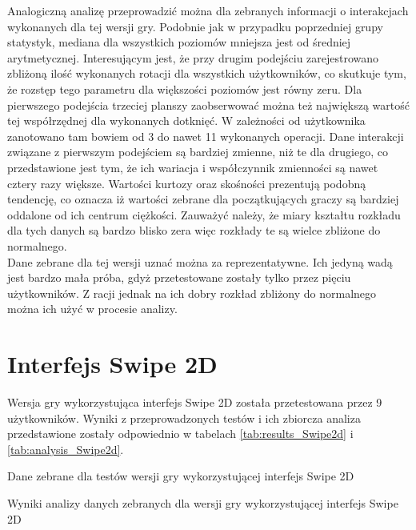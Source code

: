 \documentclass[a4paper,12pt,numbers=noenddot]{report}
\begin{document}
Analogiczną analizę przeprowadzić można dla zebranych informacji o interakcjach wykonanych dla tej wersji gry. Podobnie jak w przypadku poprzedniej grupy statystyk, mediana dla wszystkich poziomów mniejsza jest od średniej arytmetycznej. Interesującym jest, że przy drugim podejściu zarejestrowano zbliżoną ilość wykonanych rotacji dla wszystkich użytkowników, co skutkuje tym, że rozstęp tego parametru dla większości poziomów jest równy zeru. Dla pierwszego podejścia trzeciej planszy zaobserwować można też największą wartość tej współrzędnej dla wykonanych dotknięć. W zależności od użytkownika zanotowano tam bowiem od 3 do nawet 11 wykonanych operacji.
Dane interakcji związane z pierwszym podejściem są bardziej zmienne, niż te dla drugiego, co przedstawione jest tym, że ich wariacja i współczynnik zmienności są nawet cztery razy większe. Wartości kurtozy oraz skośności prezentują podobną tendencję, co oznacza iż wartości zebrane dla początkujących graczy są bardziej oddalone od ich centrum ciężkości. Zauważyć należy, że miary kształtu rozkładu dla tych danych są bardzo blisko zera więc rozkłady te są wielce zbliżone do normalnego.\\

Dane zebrane dla tej wersji uznać można za reprezentatywne. Ich jedyną wadą jest bardzo mała próba, gdyż przetestowane zostały tylko przez pięciu użytkowników. Z racji jednak na ich dobry rozkład zbliżony do normalnego można ich użyć w procesie analizy.


\section{Interfejs Swipe 2D}%
Wersja gry wykorzystująca interfejs Swipe 2D została przetestowana przez 9 użytkowników. Wyniki z przeprowadzonych testów i ich zbiorcza analiza przedstawione zostały odpowiednio w tabelach \ref{tab:results_Swipe2d} i \ref{tab:analysis_Swipe2d}.

\begin{table}
  \caption{Dane zebrane dla testów wersji gry wykorzystującej interfejs Swipe 2D}
  \resizebox{0.9\textwidth}{!}{%
	
  }
  \label{tab:results_Swipe2d}%
  
  
  \caption{Wyniki analizy danych zebranych dla wersji gry wykorzystującej interfejs Swipe 2D}
  \resizebox{0.9\textwidth}{!}{%
	
  }
  \label{tab:analysis_Swipe2d}%
\end{table}%
\end{document}
